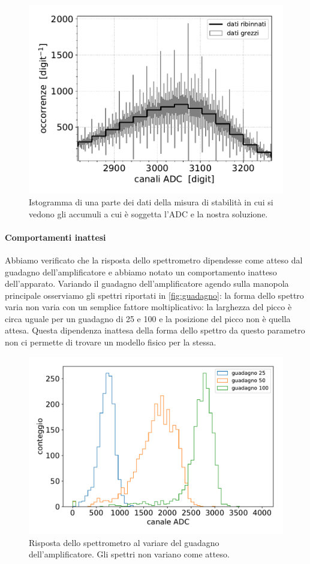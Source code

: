 \begin{figure}[h]
\centering
\includegraphics[width=30 em]{immagini/rebin}
\caption{Istogramma di una parte dei dati della misura di stabilità in cui si vedono gli accumuli a cui è soggetta l'ADC e la nostra soluzione.}
\label{picchi}
\end{figure}

\paragraph{Comportamenti inattesi} Abbiamo verificato che la risposta dello spettrometro dipendesse come atteso dal guadagno dell'amplificatore e abbiamo notato un comportamento inatteso dell'apparato. Variando il guadagno dell'amplificatore agendo sulla manopola principale osserviamo gli spettri riportati in \autoref{fig:guadagno}: la forma dello spettro varia non varia con un semplice fattore moltiplicativo: la larghezza del picco è circa uguale per un guadagno di 25 e 100 e la posizione del picco non è quella attesa. Questa dipendenza inattesa della forma dello spettro da questo parametro non ci permette di trovare un modello fisico per la stessa.

\begin{figure}[h]
	\centering
	\includegraphics[width=30 em]{immagini/all8}
	\caption{Risposta dello spettrometro al variare del guadagno dell'amplificatore. Gli spettri non variano come atteso.}
	\label{fig:guadagno}
\end{figure}